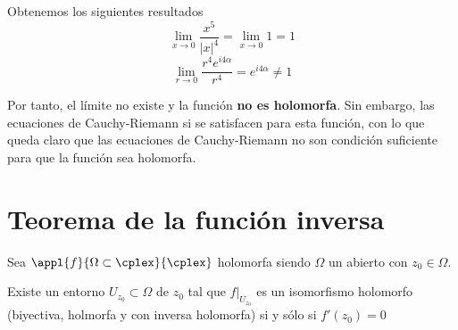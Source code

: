 \documentclass{apuntes}
\begin{document}
\begin{example}
\begin{enumerate}
Obtenemos los siguientes resultados
\[\lim_{x \to 0} \frac{x^5}{|x|^4} = \lim_{x \to 0} 1 = 1\]
\[\lim_{r \to 0} \frac{r^4 e^{i4α}}{r^4} = e^{i4α} \neq 1\]

Por tanto, el límite no existe y la función \textbf{no es holomorfa}. Sin embargo, las ecuaciones de Cauchy-Riemann si se satisfacen para esta función, con lo que queda claro que las ecuaciones de Cauchy-Riemann no son condición suficiente para que la función sea holomorfa.
\end{enumerate}
\end{example}

\section{Teorema de la función inversa}
\begin{theorem}
Sea $\appl{f}{\Omega\subset \cplex}{\cplex}$ holomorfa siendo $\Omega$ un abierto con $z_0\in \Omega$.

Existe un entorno $U_{z_0}\subset \Omega$ de $z_0$ tal que $f|_{U_{z_0}}$ es un isomorfismo holomorfo (biyectiva, holmorfa y con inversa holomorfa) si y sólo si $f'(z_0)=0$
\end{theorem}
\end{document}
